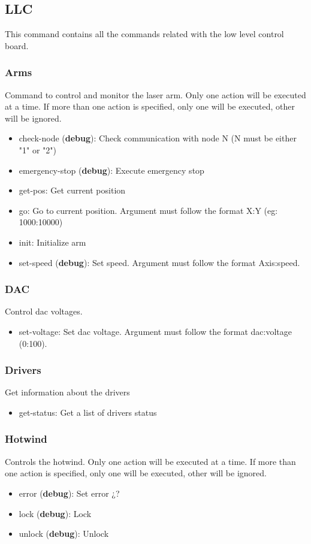 \documentclass[letterpaper, 10 pt]{article}
\begin{document}
\subsection{LLC}
This command contains all the commands related with the low level control board.
\subsubsection{Arms}
Command to control and monitor the laser arm. Only one action will be executed at a time. If more than one action is specified, only one will be executed, other will be ignored.
\begin{itemize}
	\item check-node (\textbf{debug}): Check communication with node N (N must be either "1" or "2")
	\item emergency-stop (\textbf{debug}): Execute emergency stop
	\item get-pos: Get current position
	\item go: Go to current position. Argument must follow the format X:Y (eg: 1000:10000)
	\item init: Initialize arm
	\item set-speed (\textbf{debug}): Set speed. Argument must follow the format Axis:speed.
\end{itemize}
\subsubsection{DAC}
Control dac voltages.
\begin{itemize}
	\item set-voltage: Set dac voltage. Argument must follow the format dac:voltage (0:100).
\end{itemize}

\subsubsection{Drivers}
Get information about the drivers
\begin{itemize}
	\item get-status: Get a list of drivers status
\end{itemize}

\subsubsection{Hotwind}
Controls the hotwind. Only one action will be executed at a time. If more than one action is specified, only one will be executed, other will be ignored.
\begin{itemize}
	\item error (\textbf{debug}): Set error ¿?
	\item lock (\textbf{debug}): Lock
	\item unlock (\textbf{debug}): Unlock
\end{itemize}
\end{document}
